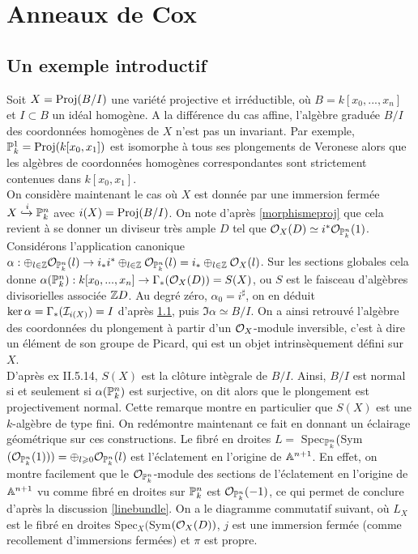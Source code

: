 \chapter{Anneaux de Cox}

\section{Un exemple introductif}

Soit $X=\operatorname{Proj}(B/I)$ une variété projective et irréductible, où $B=k[x_0,...,x_n]$ et $I\subset B$ un idéal homogène. A la différence du cas affine, l'algèbre graduée $B/I$ des coordonnées homogènes de $X$ n'est pas un invariant. Par exemple, $\mathbb{P}^1_k=\operatorname{Proj}(k[x_0,x_1])$ est isomorphe à tous ses plongements de Veronese alors que les algèbres de coordonnées homogènes correspondantes sont strictement contenues dans $k[x_0,x_1]$.\\ 
On considère maintenant le cas où $X$ est donnée par une immersion fermée $X\xhookrightarrow{i}\mathbb{P}^n_k $ avec $i(X)=\operatorname{Proj}(B/I)$. On note d'après \ref{morphismeproj} que cela revient à se donner un diviseur très ample $D$ tel que $\mathcal{O}_X(D)\simeq i^*\mathcal{O}_{\mathbb{P}^n_k}(1)$. Considérons l'application canonique $\alpha: \oplus_{l\in\mathbb{Z}}\mathcal{O}_{\mathbb{P}^n_k}(l)\rightarrow i_*i^*\oplus_{l\in \mathbb{Z}}\mathcal{O}_{\mathbb{P}^n_k}(l)=i_*\oplus_{l\in \mathbb{Z}}\mathcal{O}_X(l)$. Sur les sections globales cela donne $\alpha(\mathbb{P}^n_k): k[x_0,...,x_n]\rightarrow \Gamma_*(\mathcal{O}_X(D))=S(X)$, ou $S$ est le faisceau d'algèbres divisorielles associée $\mathbb{Z} D$. Au degré zéro, $\alpha_0=i^\sharp$, on en déduit $\ker \alpha=\Gamma_*(\mathcal{I} _{i(X)})=I$ d'après \ref{}, puis $\Im \alpha \simeq B/I$. On a ainsi retrouvé l'algèbre des coordonnées du plongement à partir d'un $\mathcal{O}_X$-module inversible, c'est à dire un élément de son groupe de Picard, qui est un objet intrinsèquement défini sur $X$.\\
D'après \cite{Hartshorne} ex II.5.14, $S(X)$ est la clôture intègrale de $B/I$. Ainsi, $B/I$ est normal si et seulement si $\alpha(\mathbb{P}^n_k)$ est surjective, on dit alors que le plongement est projectivement normal. Cette remarque montre en particulier que $S(X)$ est une $k$-algèbre de type fini. On redémontre maintenant ce fait en donnant un éclairage géométrique sur ces constructions. Le fibré en droites $L=$ Spec$_{\mathbb{P}^n_k}($Sym$(\mathcal{O}_{\mathbb{P}^n_k}(1))) = \oplus_{l\geqslant 0}\mathcal{O}_{\mathbb{P}^n_k}(l)$ est l'éclatement en l'origine de $\mathbb{A}^{n+1}$. En effet, on montre facilement que le $\mathcal{O}_{\mathbb{P}^n_k}$-module des sections de l'éclatement en l'origine de $\mathbb{A}^{n+1}$ vu comme fibré en droites sur $\mathbb{P}_k^n$ est $ \mathcal{O}_{\mathbb{P}^n_k}(-1)$, ce qui permet de conclure d'après la discussion \ref{linebundle}. On a le diagramme commutatif suivant, où $L_X$ est le fibré en droites Spec$_X($Sym$(\mathcal{O}_X(D))$, $j$ est une immersion fermée (comme recollement d'immersions fermées) et $\pi$ est propre.


